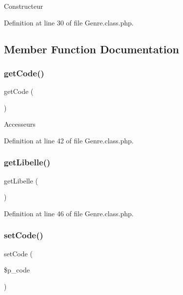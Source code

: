 Constructeur 

Definition at line 30 of file Genre.\+class.\+php.



\subsection{Member Function Documentation}
\mbox{\label{class_genre_ab5e24da53b4a0d0848b18c1e832f47ff}} 
\subsubsection{\texorpdfstring{get\+Code()}{getCode()}}
{\footnotesize\ttfamily get\+Code (\begin{DoxyParamCaption}{ }\end{DoxyParamCaption})}

Accesseurs 

Definition at line 42 of file Genre.\+class.\+php.

\mbox{\label{class_genre_a72694073dfa7e02d433daa7eeb194fcc}} 
\subsubsection{\texorpdfstring{get\+Libelle()}{getLibelle()}}
{\footnotesize\ttfamily get\+Libelle (\begin{DoxyParamCaption}{ }\end{DoxyParamCaption})}



Definition at line 46 of file Genre.\+class.\+php.

\mbox{\label{class_genre_a86ff2b38ba8118efc9c18d4b9e552ffb}} 
\subsubsection{\texorpdfstring{set\+Code()}{setCode()}}
{\footnotesize\ttfamily set\+Code (\begin{DoxyParamCaption}\item[{}]{\$p\+\_\+code }\end{DoxyParamCaption})}

